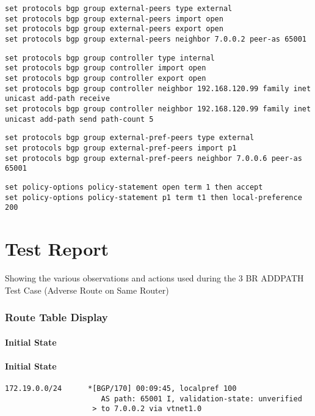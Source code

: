 \begin{lstlisting}[title=default class for external peers]
set protocols bgp group external-peers type external
set protocols bgp group external-peers import open
set protocols bgp group external-peers export open
set protocols bgp group external-peers neighbor 7.0.0.2 peer-as 65001
\end{lstlisting}


\begin{lstlisting}[title=special group for the controller - note the add-path statements]
set protocols bgp group controller type internal
set protocols bgp group controller import open
set protocols bgp group controller export open
set protocols bgp group controller neighbor 192.168.120.99 family inet unicast add-path receive
set protocols bgp group controller neighbor 192.168.120.99 family inet unicast add-path send path-count 5
\end{lstlisting}


\begin{lstlisting}[title=special case external peers\, will get higher local pref and thus may disrupt connectivity]
set protocols bgp group external-pref-peers type external
set protocols bgp group external-pref-peers import p1
set protocols bgp group external-pref-peers neighbor 7.0.0.6 peer-as 65001
\end{lstlisting}


\begin{lstlisting}[title=policy definitions used in earlier clauses.]
set policy-options policy-statement open term 1 then accept
set policy-options policy-statement p1 term t1 then local-preference 200
\end{lstlisting}

\section{Test Report}

Showing the various observations and actions used during the 3 BR ADDPATH Test Case (Adverse Route on Same Router)

\subsubsection{Route Table Display}

\paragraph{Initial State}
\paragraph{Initial State}
\begin{lstlisting}[title=As seen at ASBR1]
172.19.0.0/24      *[BGP/170] 00:09:45, localpref 100
                      AS path: 65001 I, validation-state: unverified
                    > to 7.0.0.2 via vtnet1.0
\end{lstlisting}

